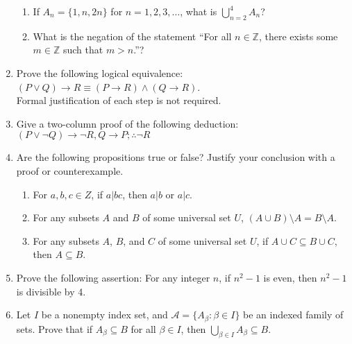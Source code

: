 \documentclass[12pt]{article}
\newcommand{\points}[1]{\marginpar{\hspace{24pt}[#1]}}
\newcommand{\di}{\displaystyle}
\newcommand{\Z}{\mathbb{Z}}
\begin{document}
\begin{enumerate}
\begin{enumerate}
\item If $A_n = \{1,n,2n\}$ for $n=1,2,3,\ldots$, what is $\displaystyle \bigcup_{n=2}^4 A_n$? \points{2}

\vspace{1.25in}

\item What is the negation of the statement ``For all $n\in\Z$, there exists some $m\in \Z$ such that $m>n$.''? \points{2}



\end{enumerate}
\newpage

\item Prove the following logical equivalence: $(P\vee Q)\to R\equiv (P\to R)\wedge (Q\to R)$. \points{4}\\ Formal justification of each step is not required.

\vspace{2.25in}

\item Give a two-column proof of the following deduction: $(P\vee \neg Q)\to \neg R, Q\to P; \therefore \neg R$ \points{7}

\newpage

\item Are the following propositions true or false? Justify your conclusion with a proof or counterexample.
\begin{enumerate}
\item For $a,b,c\in Z$, if $a|bc$, then $a|b$ or $a|c$.\points{3}

\vspace{2.5in}

\item For any subsets $A$ and $B$ of some universal set $U$, $(A\cup B)\setminus A = B\setminus A$. \points{4}

\vspace{2.5in}

\item For any subsets $A$, $B$, and $C$ of some universal set $U$, if $A\cup C\subseteq B\cup C$, then $A\subseteq B$. \points{4}

\end{enumerate}
\newpage

\item Prove the following assertion: For any integer $n$, if $n^2-1$ is even, then $n^2-1$ is divisible by 4. \points{4}

\vspace{4in}


\item Let $I$ be a nonempty index set, and $\mathcal{A} = \{A_\beta : \beta \in I\}$ be an indexed family of sets. Prove that if $A_\beta\subseteq B$ for all $\beta\in I$, then $\di\bigcup_{\beta\in I}A_\beta\subseteq B$.\points{4}
\end{enumerate}
\end{document}
